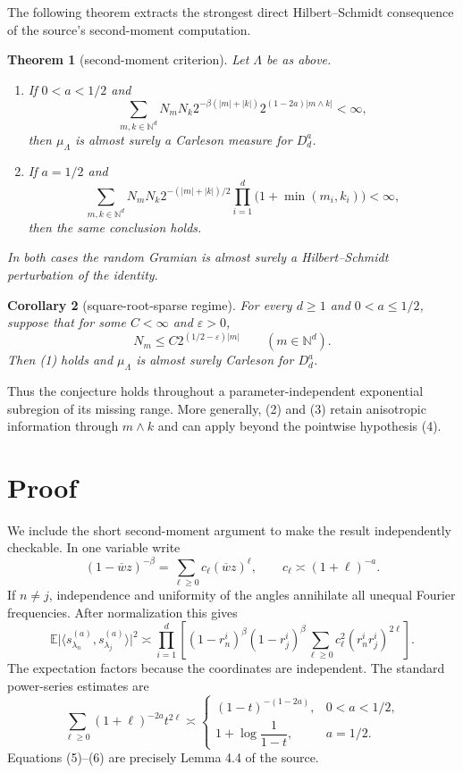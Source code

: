 \documentclass[11pt]{article}
\newtheorem{theorem}{Theorem}
\newtheorem{corollary}[theorem]{Corollary}
\newcommand{\N}{\mathbb N}
\newcommand{\E}{\mathbb E}
\newcommand{\abs}[1]{\lvert#1\rvert}
\newcommand{\ip}[2]{\langle #1,#2\rangle}
\begin{document}
The following theorem extracts the strongest direct Hilbert--Schmidt
consequence of the source's second-moment computation.

\begin{theorem}[second-moment criterion]\label{thm:criterion}
Let $\Lambda$ be as above.
\begin{enumerate}
\item If $0<a<1/2$ and
\[
 \sum_{m,k\in\N^d}N_mN_k
  2^{-\beta(\abs m+\abs k)}
  2^{(1-2a)\abs{m\wedge k}}<\infty,                                    \tag{2}
\]
then $\mu_\Lambda$ is almost surely a Carleson measure for $D_d^a$.
\item If $a=1/2$ and
\[
 \sum_{m,k\in\N^d}N_mN_k2^{-(\abs m+\abs k)/2}
       \prod_{i=1}^d\bigl(1+\min(m_i,k_i)\bigr)<\infty,                 \tag{3}
\]
then the same conclusion holds.
\end{enumerate}
In both cases the random Gramian is almost surely a Hilbert--Schmidt
perturbation of the identity.
\end{theorem}

\begin{corollary}[square-root-sparse regime]\label{cor:sparse}
For every $d\geq1$ and $0<a\leq1/2$, suppose that for some $C<\infty$ and
$\varepsilon>0$,
\[
                  N_m\leq C2^{(1/2-\varepsilon)\abs m}
                  \qquad(m\in\N^d).                                    \tag{4}
\]
Then (1) holds and $\mu_\Lambda$ is almost surely Carleson for $D_d^a$.
\end{corollary}

Thus the conjecture holds throughout a parameter-independent exponential
subregion of its missing range.  More generally, (2) and (3) retain
anisotropic information through $m\wedge k$ and can apply beyond the
pointwise hypothesis (4).

\section{Proof}

We include the short second-moment argument to make the result independently
checkable.  In one variable write
\[
       (1-\overline wz)^{-\beta}=\sum_{\ell\geq0}c_\ell
       (\overline wz)^\ell,
       \qquad c_\ell\asymp(1+\ell)^{-a}.
\]
If $n\ne j$, independence and uniformity of the angles annihilate all
unequal Fourier frequencies.  After normalization this gives
\[
 \E\abs{\ip{s_{\lambda_n}^{(a)}}{s_{\lambda_j}^{(a)}}}^2
 \asymp
 \prod_{i=1}^d\left[(1-r_n^i)^\beta(1-r_j^i)^\beta
 \sum_{\ell\geq0}c_\ell^2(r_n^ir_j^i)^{2\ell}\right].                 \tag{5}
\]
The expectation factors because the coordinates are independent.  The
standard power-series estimates are
\[
 \sum_{\ell\geq0}(1+\ell)^{-2a}t^{2\ell}
 \asymp
 \begin{cases}
 (1-t)^{-(1-2a)},&0<a<1/2,\\
 1+\log\dfrac1{1-t},&a=1/2.
 \end{cases}                                                            \tag{6}
\]
Equations (5)--(6) are precisely Lemma 4.4 of the source.
\end{document}
